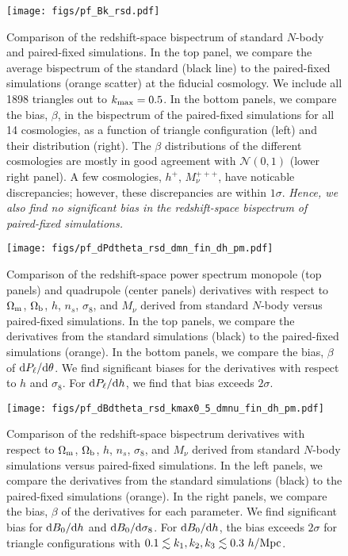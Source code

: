 \documentclass[12pt, letterpaper, preprint]{aastex62}
\newcommand{\Om}{\Omega_{\rm m}}
\newcommand{\Ob}{\Omega_{\rm b}}
\newcommand{\sig}{\sigma_8}
\newcommand{\mpc}{h/{\rm Mpc}}
\begin{document}
\begin{figure}
\begin{center}
    \texttt{[image: figs/pf\_Bk\_rsd.pdf]} 
    \caption{Comparison of the redshift-space bispectrum of standard $N$-body 
    and paired-fixed simulations. In the top panel, we compare the average 
    bispectrum of the standard (black line) to the paired-fixed simulations 
    (orange scatter) at the fiducial cosmology. We include all 1898 triangles 
    out to $k_{\rm max} = 0.5$. In the bottom panels, we compare the bias, 
    $\beta$, in the bispectrum of the paired-fixed simulations for all 14 
    cosmologies, as a function of triangle configuration (left) and their 
    distribution (right). The $\beta$ distributions of the different cosmologies 
    are mostly in good agreement with $\mathcal{N}(0,1)$ (lower right panel). 
    A few cosmologies, $h^+$, $M_\nu^{+++}$, have noticable discrepancies; however, 
    these discrepancies are within $1\sigma$. {\em Hence, we also find no significant 
    bias in the redshift-space bispectrum of paired-fixed simulations.}
    }
\label{fig:bk_rsd}
\end{center}
\end{figure}

\begin{figure}
\begin{center}
    \texttt{[image: figs/pf\_dPdtheta\_rsd\_dmn\_fin\_dh\_pm.pdf]} 
    \caption{Comparison of the redshift-space power spectrum monopole (top panels) 
    and quadrupole (center panels) derivatives with respect to $\Om$, $\Ob$, $h$, 
    $n_s$, $\sigma_8$, and $M_\nu$ derived from standard $N$-body versus 
    paired-fixed simulations. In the top panels, we compare the derivatives from 
    the standard simulations (black) to the paired-fixed simulations (orange). 
    In the bottom panels, we compare the bias, $\beta$ of ${\rm d} P_\ell/{\rm d}\theta$.
    We find significant biases for the derivatives with respect to $h$ and $\sig$. 
    For ${\rm d} P_\ell/{\rm d}h$, we find that bias exceeds $2\sigma$.} 
\label{fig:dpk_rsd}
\end{center}
\end{figure}

\begin{figure}
\begin{center}
    \texttt{[image: figs/pf\_dBdtheta\_rsd\_kmax0\_5\_dmnu\_fin\_dh\_pm.pdf]} 
    \caption{Comparison of the redshift-space bispectrum derivatives with respect
    to $\Om$, $\Ob$, $h$, $n_s$, $\sigma_8$, and $M_\nu$ derived from standard 
    $N$-body simulations versus paired-fixed simulations. In the left panels, we 
    compare the derivatives from the standard simulations (black) to the paired-fixed
    simulations (orange). In the right panels, we compare the bias, $\beta$ of
    the derivatives for each parameter. We find significant bias for ${\rm d} B_0/{\rm d}h$
    and ${\rm d} B_0/{\rm d}\sig$. For ${\rm d} B_0/{\rm d}h$, the bias exceeds 
    $2\sigma$ for triangle configurations with $0.1 \lesssim k_1, k_2, k_3 \lesssim 0.3~\mpc$.}
\label{fig:dbk_rsd}
\end{center}
\end{figure}
\end{document}
